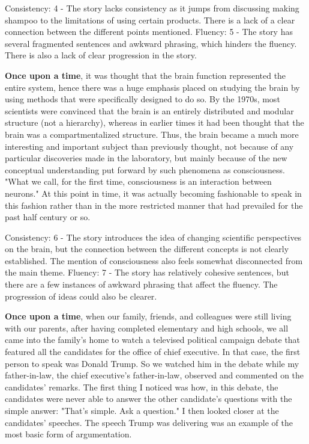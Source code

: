 \documentclass{article}
\begin{document}
Consistency: 4 - The story lacks consistency as it jumps from discussing making shampoo to the limitations of using certain products. There is a lack of a clear connection between the different points mentioned.
Fluency: 5 - The story has several fragmented sentences and awkward phrasing, which hinders the fluency. There is also a lack of clear progression in the story.

\textbf{Once upon a time}, it was thought that the brain function represented the entire system, hence there was a huge emphasis placed on studying the brain by using methods that were specifically designed to do so. By the 1970s, most scientists were convinced that the brain is an entirely distributed and modular structure (not a hierarchy), whereas in earlier times it had been thought that the brain was a compartmentalized structure. Thus, the brain became a much more interesting and important subject than previously thought, not because of any particular discoveries made in the laboratory, but mainly because of the new conceptual understanding put forward by such phenomena as consciousness. "What we call, for the first time, consciousness is an interaction between neurons." At this point in time, it was actually becoming fashionable to speak in this fashion rather than in the more restricted manner that had prevailed for the past half century or so.

Consistency: 6 - The story introduces the idea of changing scientific perspectives on the brain, but the connection between the different concepts is not clearly established. The mention of consciousness also feels somewhat disconnected from the main theme.
Fluency: 7 - The story has relatively cohesive sentences, but there are a few instances of awkward phrasing that affect the fluency. The progression of ideas could also be clearer.

\textbf{Once upon a time}, when our family, friends, and colleagues were still living with our parents, after having completed elementary and high schools, we all came into the family's home to watch a televised political campaign debate that featured all the candidates for the office of chief executive. In that case, the first person to speak was Donald Trump. So we watched him in the debate while my father-in-law, the chief executive's father-in-law, observed and commented on the candidates' remarks. The first thing I noticed was how, in this debate, the candidates were never able to answer the other candidate's questions with the simple answer: "That's simple. Ask a question." I then looked closer at the candidates' speeches. The speech Trump was delivering was an example of the most basic form of argumentation.
\end{document}
